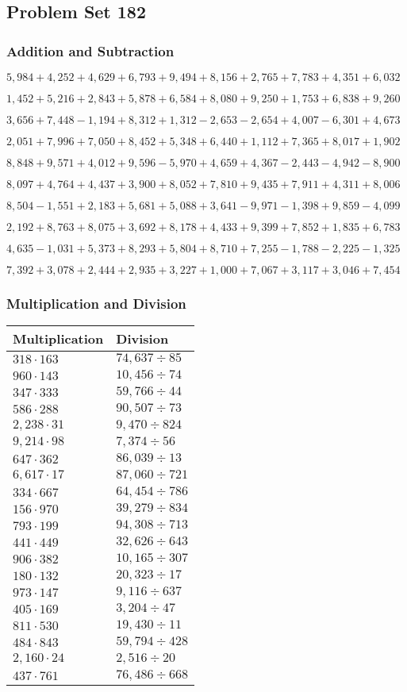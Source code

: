 \hypertarget{problem-set-182}{%
\subsection{Problem Set 182}\label{problem-set-182}}

\hypertarget{addition-and-subtraction}{%
\subsubsection{Addition and
Subtraction}\label{addition-and-subtraction}}

\(5,984+4,252+4,629+6,793+9,494+8,156+2,765+7,783+4,351+6,032\)

\(1,452+5,216+2,843+5,878+6,584+8,080+9,250+1,753+6,838+9,260\)

\(3,656+7,448-1,194+8,312+1,312-2,653-2,654+4,007-6,301+4,673\)

\(2,051+7,996+7,050+8,452+5,348+6,440+1,112+7,365+8,017+1,902\)

\(8,848+9,571+4,012+9,596-5,970+4,659+4,367-2,443-4,942-8,900\)

\(8,097+4,764+4,437+3,900+8,052+7,810+9,435+7,911+4,311+8,006\)

\(8,504-1,551+2,183+5,681+5,088+3,641-9,971-1,398+9,859-4,099\)

\(2,192+8,763+8,075+3,692+8,178+4,433+9,399+7,852+1,835+6,783\)

\(4,635-1,031+5,373+8,293+5,804+8,710+7,255-1,788-2,225-1,325\)

\(7,392+3,078+2,444+2,935+3,227+1,000+7,067+3,117+3,046+7,454\)

\hypertarget{multiplication-and-division}{%
\subsubsection{Multiplication and
Division}\label{multiplication-and-division}}

\begin{longtable}[]{@{}ll@{}}
\toprule
Multiplication & Division\tabularnewline
\midrule
\endhead
\(318\cdot163\) & \(74,637÷85\)\tabularnewline
\(960\cdot143\) & \(10,456÷74\)\tabularnewline
\(347\cdot333\) & \(59,766÷44\)\tabularnewline
\(586\cdot288\) & \(90,507÷73\)\tabularnewline
\(2,238\cdot31\) & \(9,470÷824\)\tabularnewline
\(9,214\cdot98\) & \(7,374÷56\)\tabularnewline
\(647\cdot362\) & \(86,039÷13\)\tabularnewline
\(6,617\cdot17\) & \(87,060÷721\)\tabularnewline
\(334\cdot667\) & \(64,454÷786\)\tabularnewline
\(156\cdot970\) & \(39,279÷834\)\tabularnewline
\(793\cdot199\) & \(94,308÷713\)\tabularnewline
\(441\cdot449\) & \(32,626÷643\)\tabularnewline
\(906\cdot382\) & \(10,165÷307\)\tabularnewline
\(180\cdot132\) & \(20,323÷17\)\tabularnewline
\(973\cdot147\) & \(9,116÷637\)\tabularnewline
\(405\cdot169\) & \(3,204÷47\)\tabularnewline
\(811\cdot530\) & \(19,430÷11\)\tabularnewline
\(484\cdot843\) & \(59,794÷428\)\tabularnewline
\(2,160\cdot24\) & \(2,516÷20\)\tabularnewline
\(437\cdot761\) & \(76,486÷668\)\tabularnewline
\bottomrule
\end{longtable}
